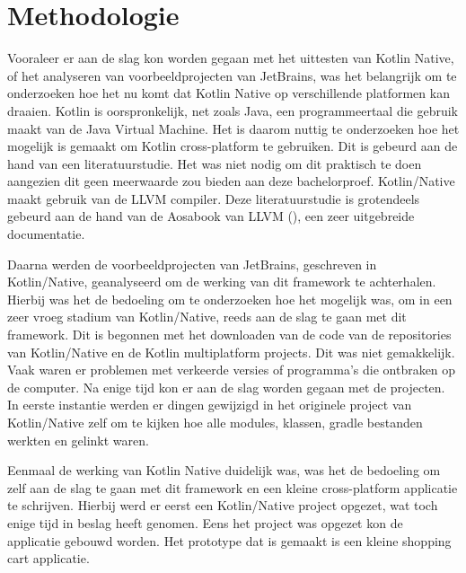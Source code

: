 
\chapter{Methodologie}
\label{ch:methodologie}


Vooraleer er aan de slag kon worden gegaan met het uittesten van Kotlin Native, of het analyseren van voorbeeldprojecten van JetBrains, was het belangrijk om te onderzoeken hoe het nu komt dat Kotlin Native op verschillende platformen kan draaien. Kotlin is oorspronkelijk, net zoals Java, een programmeertaal die gebruik maakt van de Java Virtual Machine. Het is daarom nuttig te onderzoeken hoe het mogelijk is gemaakt om Kotlin cross-platform te gebruiken. Dit is gebeurd aan de hand van een literatuurstudie. Het was niet nodig om dit praktisch te doen aangezien dit geen meerwaarde zou bieden aan deze bachelorproef. Kotlin/Native maakt gebruik van de LLVM compiler. Deze literatuurstudie is grotendeels gebeurd aan de hand van de Aosabook van LLVM (\cite{aosa}), een zeer uitgebreide documentatie. 

Daarna werden de voorbeeldprojecten van JetBrains, geschreven in Kotlin/Native, geanalyseerd om de werking van dit framework te achterhalen. Hierbij was het de bedoeling om te onderzoeken hoe het mogelijk was, om in een zeer vroeg stadium van Kotlin/Native, reeds aan de slag te gaan met dit framework. Dit is begonnen met het downloaden van de code van de repositories van Kotlin/Native en de Kotlin multiplatform projects. Dit was niet gemakkelijk. Vaak waren er problemen met verkeerde versies of programma's die ontbraken op de computer. Na enige tijd kon er aan de slag worden gegaan met de projecten. In eerste instantie werden er dingen gewijzigd in het originele project van Kotlin/Native zelf om te kijken hoe alle modules, klassen, gradle bestanden werkten en gelinkt waren.

Eenmaal de werking van Kotlin Native duidelijk was, was het de bedoeling om zelf aan de slag te gaan met dit framework en een kleine cross-platform applicatie te schrijven. Hierbij werd er eerst een Kotlin/Native project opgezet, wat toch enige tijd in beslag heeft genomen. Eens het project was opgezet kon de applicatie gebouwd worden. Het prototype dat is gemaakt is een kleine shopping cart applicatie.

